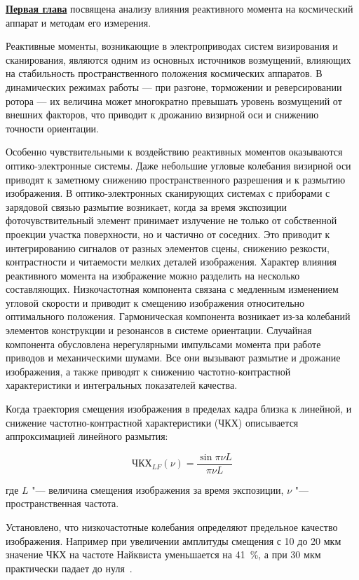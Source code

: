 \underline{\textbf{Первая глава}} посвящена анализу влияния реактивного момента на космический аппарат и методам его измерения.

Реактивные моменты, возникающие в электроприводах систем визирования и сканирования, являются одним из основных источников возмущений, влияющих на стабильность пространственного положения космических аппаратов. В динамических режимах работы — при разгоне, торможении и реверсировании ротора — их величина может многократно превышать уровень возмущений от внешних факторов, что приводит к дрожанию визирной оси и снижению точности ориентации.

Особенно чувствительными к воздействию реактивных моментов оказываются оптико-электронные системы. Даже небольшие угловые колебания визирной оси приводят к заметному снижению пространственного разрешения и к размытию изображения. В оптико-электронных сканирующих системах с приборами с зарядовой связью размытие возникает, когда за время экспозиции фоточувствительный элемент принимает излучение не только от собственной проекции участка поверхности, но и частично от соседних. Это приводит к интегрированию сигналов от разных элементов сцены, снижению резкости, контрастности и читаемости мелких деталей изображения. Характер влияния реактивного момента на изображение можно разделить на несколько составляющих. Низкочастотная компонента связана с медленным изменением угловой скорости и приводит к смещению изображения относительно оптимального положения. Гармоническая компонента возникает из-за колебаний элементов конструкции и резонансов в системе ориентации. Случайная компонента обусловлена нерегулярными импульсами момента при работе приводов и механическими шумами. Все они вызывают размытие и дрожание изображения, а также приводят к снижению частотно-контрастной характеристики и интегральных показателей качества.

Когда траектория смещения изображения в пределах кадра близка к линейной, и снижение частотно-контрастной характеристики (ЧКХ) описывается аппроксимацией
линейного размытия:

\begin{equation}
	\label{mtf_lf}
	\text{ЧКХ}_{LF}(\nu)=\frac{\sin{\pi \nu L}}{\pi \nu L}
\end{equation}

где \(L\) "--- величина смещения изображения за время экспозиции, \(\nu\) "--- пространственная частота.

Установлено, что низкочастотные колебания определяют предельное качество изображения. Например при увеличении амплитуды смещения с 10 до 20 мкм значение ЧКХ на частоте Найквиста уменьшается на 41~\%, а при 30 мкм практически падает до нуля~\cite{wahballah2018smear}.

